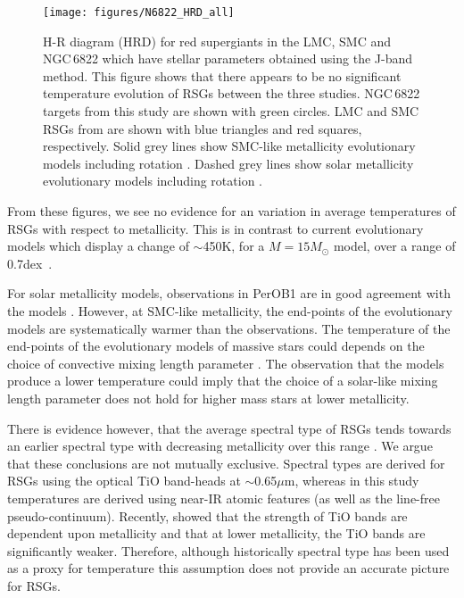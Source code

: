 \documentclass[iop]{emulateapj}
\begin{document}
\begin{figure}
\texttt{[image: figures/N6822\_HRD\_all]}
\caption{
H-R diagram (HRD) for red supergiants in the LMC, SMC and NGC\,6822 which have stellar parameters obtained using the J-band method.
This figure shows that there appears to be no significant temperature evolution of RSGs between the three studies.
NGC\,6822 targets from this study are shown with green circles.
LMC and SMC RSGs from
\protect\cite{Davies14}
are shown with blue triangles and red squares, respectively.
Solid grey lines show SMC-like metallicity evolutionary models including rotation
\protect\citep{2013A&A...558A.103G}.
Dashed grey lines show solar metallicity evolutionary models including rotation
\protect\citep{Ekstrom12}.\label{fig:HRD}
        }
\end{figure}


From these figures, we see no evidence for an variation in average temperatures of RSGs with respect to metallicity.
This is in contrast to current evolutionary models which display a change of $\sim$450K,
for a $M=15M_{\odot}$ model,
over a range of 0.7dex~\citep{Ekstrom12,2013A&A...558A.103G}.

For solar metallicity models, observations in PerOB1 are in good agreement with the models
\citep[see Figure 9 in][]{2014ApJ...788...58G}.
However, at SMC-like metallicity, the end-points of the evolutionary models are systematically warmer than the observations.
The temperature of the end-points of the evolutionary models of massive stars could depends on the choice of convective mixing length parameter
\citep{1992A&AS...96..269S}.
The observation that the models produce a lower temperature could imply that the choice of a solar-like mixing length parameter does not hold for higher mass stars at lower metallicity.

There is evidence however,
that the average spectral type of RSGs tends towards an earlier spectral type with decreasing metallicity over this range
\citep{Levesque12}.
We argue that these conclusions are not mutually exclusive.
Spectral types are derived for RSGs using the optical TiO band-heads at
$\sim$0.65$\mu$m,
whereas in this study temperatures are derived using near-IR atomic features
(as well as the line-free pseudo-continuum).
Recently,
\cite{Davies13a} showed that the strength of TiO bands are dependent upon metallicity and that at lower metallicity, the TiO bands are significantly weaker.
Therefore, although historically spectral type has been used as a proxy for temperature this assumption does not provide an accurate picture for RSGs.
\end{document}
